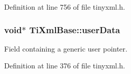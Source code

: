 Definition at line 756 of file tinyxml.h.

\hypertarget{classTiXmlBase_ab242c01590191f644569fa89a080d97c}{
\subsubsection[{userData}]{\setlength{\rightskip}{0pt plus 5cm}void$\ast$ {\bf TiXmlBase::userData}}}
\label{d8/d47/classTiXmlBase_ab242c01590191f644569fa89a080d97c}


Field containing a generic user pointer. 



Definition at line 376 of file tinyxml.h.

